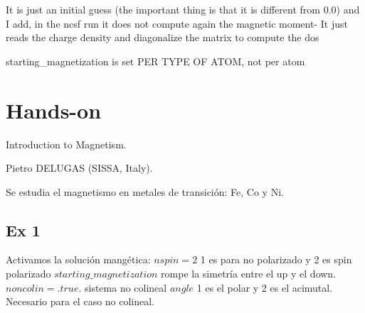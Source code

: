 
  It is just an initial guess (the important thing is that it is different from 0.0) and I add, in the ncsf run it does not compute again the magnetic moment- It just reads the charge  density and diagonalize the matrix to compute the dos


  starting\_magnetization is set PER TYPE OF ATOM, not per atom

\section{Hands-on}

   Introduction to Magnetism.

  	Pietro DELUGAS (SISSA, Italy).

  Se estudia el magnetismo en metales de transición: Fe, Co y Ni.

\subsection{Ex 1}

  Activamos la solución mangética:
  $nspin = 2$ 1 es para no polarizado y 2 es spin polarizado
  $starting\_magnetization$ rompe la simetría entre el up y el down.
  $noncolin=.true.$ sistema no colineal
  $angle$ 1 es el polar y 2 es el acimutal. Necesario para el caso no colineal.
